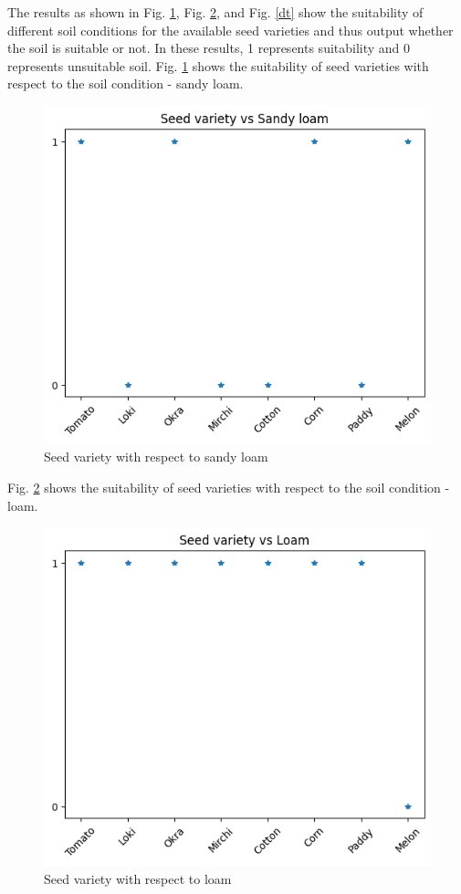 \documentclass[conference]{IEEEtran}
\begin{document}
The results as shown in Fig. \ref{de}, Fig. \ref{df}, and Fig. \ref{dt} show the suitability of different soil conditions for the available seed varieties and thus output whether the soil is suitable or not. In these results, 1 represents suitability and 0 represents unsuitable soil.
Fig. \ref{de} shows the suitability of seed varieties with respect to the soil condition - sandy loam.
\begin{figure}[htp]
    \centering
    \includegraphics[scale=0.4]{download (2).png}
    \caption{Seed variety with respect to sandy loam}
    \label{de}
\end{figure}
Fig. \ref{df} shows the suitability of seed varieties with respect to the soil condition - loam.
\begin{figure}[htp]
    \centering
    \includegraphics[scale=0.4]{download (3).png}
    \caption{Seed variety with respect to loam}
    \label{df}
\end{figure}
\end{document}
